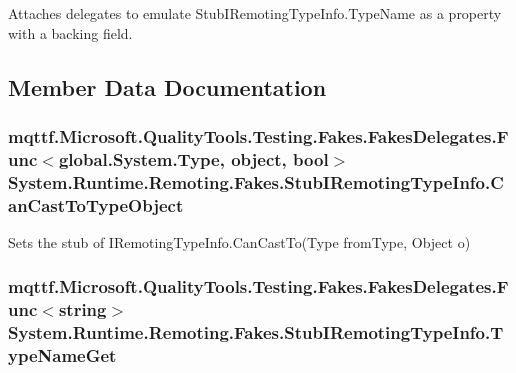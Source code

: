 Attaches delegates to emulate Stub\-I\-Remoting\-Type\-Info.\-Type\-Name as a property with a backing field.



\subsection{Member Data Documentation}
\hypertarget{class_system_1_1_runtime_1_1_remoting_1_1_fakes_1_1_stub_i_remoting_type_info_abefce566b24758bd25e3bb2ed4827655}{
\subsubsection[{Can\-Cast\-To\-Type\-Object}]{\setlength{\rightskip}{0pt plus 5cm}mqttf.\-Microsoft.\-Quality\-Tools.\-Testing.\-Fakes.\-Fakes\-Delegates.\-Func$<$global.\-System.\-Type, object, bool$>$ System.\-Runtime.\-Remoting.\-Fakes.\-Stub\-I\-Remoting\-Type\-Info.\-Can\-Cast\-To\-Type\-Object}}\label{class_system_1_1_runtime_1_1_remoting_1_1_fakes_1_1_stub_i_remoting_type_info_abefce566b24758bd25e3bb2ed4827655}


Sets the stub of I\-Remoting\-Type\-Info.\-Can\-Cast\-To(\-Type from\-Type, Object o)

\hypertarget{class_system_1_1_runtime_1_1_remoting_1_1_fakes_1_1_stub_i_remoting_type_info_ac6a30122dd3130e626103a717c73b821}{
\subsubsection[{Type\-Name\-Get}]{\setlength{\rightskip}{0pt plus 5cm}mqttf.\-Microsoft.\-Quality\-Tools.\-Testing.\-Fakes.\-Fakes\-Delegates.\-Func$<$string$>$ System.\-Runtime.\-Remoting.\-Fakes.\-Stub\-I\-Remoting\-Type\-Info.\-Type\-Name\-Get}}\label{class_system_1_1_runtime_1_1_remoting_1_1_fakes_1_1_stub_i_remoting_type_info_ac6a30122dd3130e626103a717c73b821}


